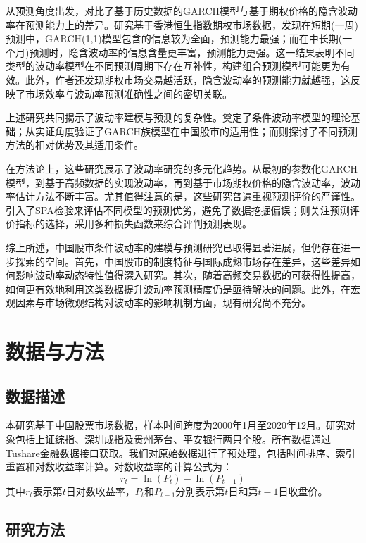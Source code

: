 \documentclass[12pt, a4paper]{article}
\begin{document}
从预测角度出发，\citet{zheng2010volatility}对比了基于历史数据的GARCH模型与基于期权价格的隐含波动率在预测能力上的差异。研究基于香港恒生指数期权市场数据，发现在短期(一周)预测中，GARCH(1,1)模型包含的信息较为全面，预测能力最强；而在中长期(一个月)预测时，隐含波动率的信息含量更丰富，预测能力更强。这一结果表明不同类型的波动率模型在不同预测周期下存在互补性，构建组合预测模型可能更为有效。此外，作者还发现期权市场交易越活跃，隐含波动率的预测能力就越强，这反映了市场效率与波动率预测准确性之间的密切关联。

上述研究共同揭示了波动率建模与预测的复杂性。\citet{engle2004risk}奠定了条件波动率模型的理论基础；\citet{wei2007volatility}从实证角度验证了GARCH族模型在中国股市的适用性；而\citet{zheng2010volatility}则探讨了不同预测方法的相对优势及其适用条件。

在方法论上，这些研究展示了波动率研究的多元化趋势。从最初的参数化GARCH模型，到基于高频数据的实现波动率，再到基于市场期权价格的隐含波动率，波动率估计方法不断丰富。尤其值得注意的是，这些研究普遍重视预测评价的严谨性。\citet{wei2007volatility}引入了SPA检验来评估不同模型的预测优劣，避免了数据挖掘偏误；\citet{zheng2010volatility}则关注预测评价指标的选择，采用多种损失函数来综合评判预测表现。

综上所述，中国股市条件波动率的建模与预测研究已取得显著进展，但仍存在进一步探索的空间。首先，中国股市的制度特征与国际成熟市场存在差异，这些差异如何影响波动率动态特性值得深入研究。其次，随着高频交易数据的可获得性提高，如何更有效地利用这类数据提升波动率预测精度仍是亟待解决的问题。此外，在宏观因素与市场微观结构对波动率的影响机制方面，现有研究尚不充分。

\section{数据与方法}

\subsection{数据描述}
本研究基于中国股票市场数据，样本时间跨度为2000年1月至2020年12月。研究对象包括上证综指、深圳成指及贵州茅台、平安银行两只个股。所有数据通过Tushare金融数据接口获取。我们对原始数据进行了预处理，包括时间排序、索引重置和对数收益率计算。对数收益率的计算公式为：
\begin{equation}
r_t = \ln(P_t) - \ln(P_{t-1})
\end{equation}
其中$r_t$表示第$t$日对数收益率，$P_t$和$P_{t-1}$分别表示第$t$日和第$t-1$日收盘价。

\subsection{研究方法}
\end{document}
